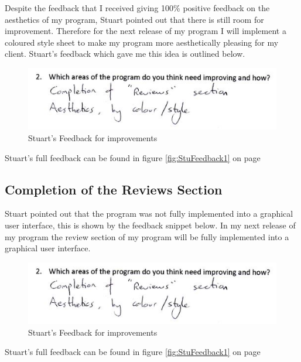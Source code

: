 Despite the feedback that I received giving 100\% positive feedback on the aesthetics of my program, Stuart pointed out that there is still room for improvement. Therefore for the next release of my program I will implement a coloured style sheet to make my program more aesthetically pleasing for my client. Stuart's feedback which gave me this idea is outlined below.

\begin{figure}[H]
    \includegraphics[width=\textwidth]{./Evaluation/images/StuImprovements.jpg}
    \caption{Stuart's Feedback for improvements} \label{fig:StuImprovementFeedback}
\end{figure}

Stuart's full feedback can be found in figure \ref{fig:StuFeedback1} on page \pageref{fig:StuFeedback1}

	\subsection{Completion of the Reviews Section}

Stuart pointed out that the program was not fully implemented into a graphical user interface, this is shown by the feedback snippet below. In my next release of my program the review section of my program will be fully implemented into a graphical user interface.

\begin{figure}[H]
    \includegraphics[width=\textwidth]{./Evaluation/images/StuImprovements.jpg}
    \caption{Stuart's Feedback for improvements} \label{fig:StuImprovementFeedback}
\end{figure}

Stuart's full feedback can be found in figure \ref{fig:StuFeedback1} on page \pageref{fig:StuFeedback1}


